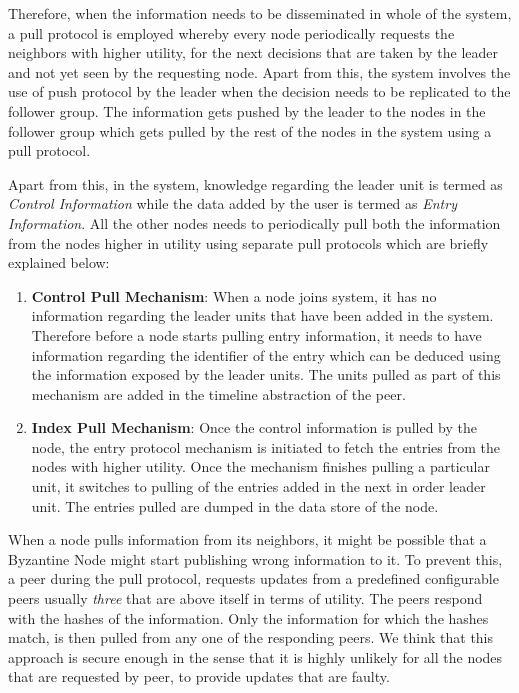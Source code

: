 \documentclass[a4paper,11pt]{kth-mag}
\begin{document}
Therefore, when the information needs to be disseminated in whole of the system, a pull protocol is employed whereby every node periodically requests the neighbors with higher utility, for the next decisions that are taken by the leader and not yet seen by the requesting node. Apart from this, the system involves the use of push protocol by the leader when the decision needs to be replicated to the follower group. The information gets pushed by the leader to the nodes in the follower group which gets pulled by the rest of the nodes in the system using a pull protocol.

\par Apart from this, in the system, knowledge regarding the leader unit is termed as \textit{Control Information} while the data added by the user is termed as \textit{Entry Information}. All the other nodes needs to periodically pull both the information from the nodes higher in utility using separate pull protocols which are briefly explained below:

\begin{enumerate}

\item[] \textbf{Control Pull Mechanism}: When a node joins system, it has no information regarding the leader units that have been added in the system. Therefore before a node starts pulling entry information, it needs to have information regarding the identifier of the entry which can be deduced using the information exposed by the leader units. The units pulled as part of this mechanism are added in the timeline abstraction of the peer.

\item[] \textbf{Index Pull Mechanism}: Once the control information is pulled by the node, the entry protocol mechanism is initiated to fetch the entries from the nodes with higher utility. Once the mechanism finishes pulling a particular unit, it switches to pulling of the entries added in the next in order leader unit. The entries pulled are dumped in the data store of the node.

\end{enumerate}

When a node pulls information from its neighbors, it might be possible that a Byzantine Node might start publishing wrong information to it. To prevent this, a peer during the pull protocol, requests updates from a predefined configurable peers usually \textit{three} that are above itself in terms of utility.  The peers respond with the hashes of the information. Only the information for which the hashes match, is then pulled from any one of the responding peers. We think that this approach is secure enough in the sense that it is highly unlikely for all the nodes that are requested by peer, to provide updates that are faulty.
\end{document}
